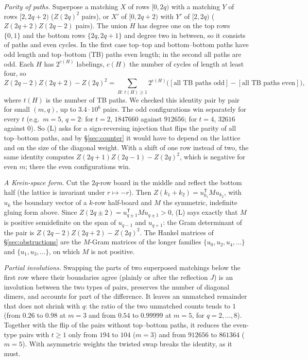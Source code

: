 \documentclass[11pt]{amsart}
\theoremstyle{definition}
\theoremstyle{remark}
\begin{document}
\emph{Parity of paths.} Superpose a matching $X$ of rows $[0, 2q)$ with a matching $Y$ of rows
$[2, 2q+2)$ ($Z(2q)^2$ pairs), or $X'$ of $[0, 2q+2)$ with $Y'$ of $[2, 2q)$ ($Z(2q+2)Z(2q-2)$
pairs). The union $H$ has degree one on the top rows $\{0, 1\}$ and the bottom rows $\{2q, 2q+1\}$
and degree two in between, so it consists of paths and even cycles. In the first case top--top and
bottom--bottom paths have odd length and top--bottom (TB) paths even length; in the second all
paths are odd. Each $H$ has $2^{c(H)}$ labelings, $c(H)$ the number of cycles of length at least
four, so
\[
  Z(2q-2)Z(2q+2) - Z(2q)^2 = \sum_{H:\,t(H) \ge 1} 2^{c(H)}
  \bigl([\text{all TB paths odd}] - [\text{all TB paths even}]\bigr),
\]
where $t(H)$ is the number of TB paths. We checked this identity pair by pair for small $(m, q)$,
up to $3.4\cdot10^{6}$ pairs. The odd configurations win separately for every $t$ (e.g.\ $m = 5$,
$q = 2$: for $t = 2$, $1847660$ against $912656$; for $t = 4$, $32616$ against $0$). So (L) asks for
a sign-reversing injection that flips the parity of all top--bottom paths, and by
\S\ref{sec:counter} it would have to depend on the lattice and on the size of the diagonal weight.
With a shift of one row instead of two, the same identity computes $Z(2q+1)Z(2q-1) - Z(2q)^2$,
which is negative for even $m$; there the even configurations win.

\emph{A Krein-space form.} Cut the $2q$-row board in the middle and reflect the bottom half (the
lattice is invariant under $r \mapsto -r$). Then $Z(k_1 + k_2) = u_{k_1}^{\mathsf T} M u_{k_2}$,
with $u_k$ the boundary vector of a $k$-row half-board and $M$ the symmetric, indefinite gluing form
above. Since $Z(2q \pm 2) = u_{q \pm 1}^{\mathsf T} M u_{q \pm 1} > 0$, (L) says exactly that $M$ is
positive semidefinite on the span of $u_{q-1}$ and $u_{q+1}$: the Gram determinant of the pair is
$Z(2q-2)Z(2q+2) - Z(2q)^2$. The Hankel matrices of \S\ref{sec:obstructions} are the $M$-Gram matrices
of the longer families $\{u_0, u_2, u_4, \dots\}$ and $\{u_1, u_3, \dots\}$, on which $M$ is not
positive.

\emph{Partial involutions.} Swapping the parts of two superposed matchings below the first row
where their boundaries agree (plainly or after the reflection $J$) is an involution between the
two types of pairs, preserves the number of diagonal dimers, and accounts for part of the
difference. It leaves an unmatched remainder that does not shrink with $q$: the ratio of the two
unmatched counts tends to $1$ (from $0.26$ to $0.98$ at $m = 3$ and from $0.54$ to $0.99999$ at
$m = 5$, for $q = 2, \dots, 8$). Together with the flip of the pairs without top--bottom paths, it
reduces the even-type pairs with $t \ge 1$ only from $194$ to $104$ ($m = 3$) and from $912656$ to
$861364$ ($m = 5$). With asymmetric weights the twisted swap breaks the identity, as it must.
\end{document}
